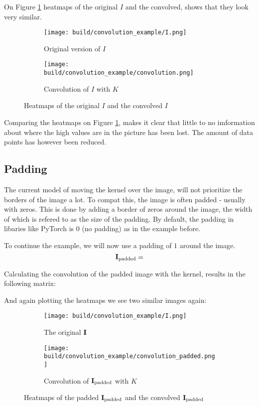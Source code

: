 On Figure \ref{fig:convolution_example} heatmaps of the original $I$ and the convolved, shows that they look very similar.
\begin{figure}[h]
\centering
\begin{subfigure}{0.45\textwidth}
    \texttt{[image: build/convolution\_example/I.png]}
    \caption{Original version of $I$}
\end{subfigure}
\begin{subfigure}{0.45\textwidth}
    \texttt{[image: build/convolution\_example/convolution.png]}
    \caption{Convolution of $I$ with $K$}
\end{subfigure}
\caption{Heatmaps of the original $I$ and the convolved $I$}
\label{fig:convolution_example}
\end{figure}

Comparing the heatmaps on Figure \ref{fig:convolution_example}, makes it clear that little to no imformation about
where the high values are in the picture has been lost.
The amount of data points has however been reduced.

\subsection{Padding}
The current model of moving the kernel over the image, will not prioritize the borders
of the image a lot. 
To compat this, the image is often padded - usually with zeros. 
This is done by adding a border of zeros around the image, the width of which is refered to as the size of the padding.
By default, the padding in libaries like PyTorch \cite{PyTorch} is $0$ (no padding) as in the example before.

To continue the example, we will now use a padding of $1$ around the image.
\begin{equation}
    \textbf{I}_{\text{padded}} = 
\end{equation}

Calculating the convolution of the padded image with the kernel, results in the following matrix:
\begin{equation}
    
\end{equation}

And again plotting the heatmaps we see two similar images again:
\begin{figure}[h]
\centering
\begin{subfigure}{0.45\textwidth}
    \texttt{[image: build/convolution\_example/I.png]}
    \caption{The original $\textbf{I}$}
\end{subfigure}
\begin{subfigure}{0.45\textwidth}
    \texttt{[image: build/convolution\_example/convolution\_padded.png]}
    \caption{Convolution of $\textbf{I}_{\text{padded}}$ with $K$}
\end{subfigure}
\caption{Heatmaps of the padded $\textbf{I}_{\text{padded}}$ and the convolved $\textbf{I}_{\text{padded}}$}
\label{fig:convolution_example_padded}
\end{figure}

